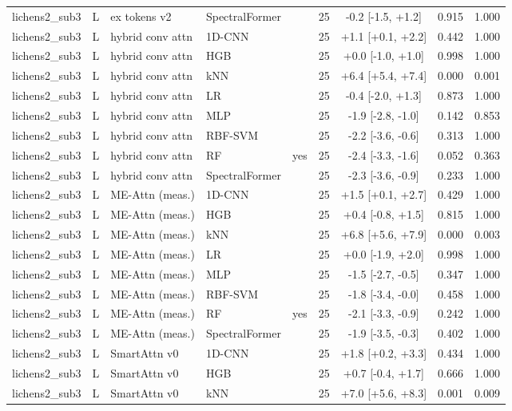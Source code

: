 \begin{tabular}{lllllcccc}
lichens2_sub3 & L & ex tokens v2 & SpectralFormer &  & 25 & -0.2 [-1.5, +1.2] & 0.915 & 1.000 \\
lichens2_sub3 & L & hybrid conv attn & 1D-CNN &  & 25 & +1.1 [+0.1, +2.2] & 0.442 & 1.000 \\
lichens2_sub3 & L & hybrid conv attn & HGB &  & 25 & +0.0 [-1.0, +1.0] & 0.998 & 1.000 \\
lichens2_sub3 & L & hybrid conv attn & kNN &  & 25 & +6.4 [+5.4, +7.4] & 0.000 & 0.001 \\
lichens2_sub3 & L & hybrid conv attn & LR &  & 25 & -0.4 [-2.0, +1.3] & 0.873 & 1.000 \\
lichens2_sub3 & L & hybrid conv attn & MLP &  & 25 & -1.9 [-2.8, -1.0] & 0.142 & 0.853 \\
lichens2_sub3 & L & hybrid conv attn & RBF-SVM &  & 25 & -2.2 [-3.6, -0.6] & 0.313 & 1.000 \\
lichens2_sub3 & L & hybrid conv attn & RF & yes & 25 & -2.4 [-3.3, -1.6] & 0.052 & 0.363 \\
lichens2_sub3 & L & hybrid conv attn & SpectralFormer &  & 25 & -2.3 [-3.6, -0.9] & 0.233 & 1.000 \\
lichens2_sub3 & L & ME-Attn (meas.) & 1D-CNN &  & 25 & +1.5 [+0.1, +2.7] & 0.429 & 1.000 \\
lichens2_sub3 & L & ME-Attn (meas.) & HGB &  & 25 & +0.4 [-0.8, +1.5] & 0.815 & 1.000 \\
lichens2_sub3 & L & ME-Attn (meas.) & kNN &  & 25 & +6.8 [+5.6, +7.9] & 0.000 & 0.003 \\
lichens2_sub3 & L & ME-Attn (meas.) & LR &  & 25 & +0.0 [-1.9, +2.0] & 0.998 & 1.000 \\
lichens2_sub3 & L & ME-Attn (meas.) & MLP &  & 25 & -1.5 [-2.7, -0.5] & 0.347 & 1.000 \\
lichens2_sub3 & L & ME-Attn (meas.) & RBF-SVM &  & 25 & -1.8 [-3.4, -0.0] & 0.458 & 1.000 \\
lichens2_sub3 & L & ME-Attn (meas.) & RF & yes & 25 & -2.1 [-3.3, -0.9] & 0.242 & 1.000 \\
lichens2_sub3 & L & ME-Attn (meas.) & SpectralFormer &  & 25 & -1.9 [-3.5, -0.3] & 0.402 & 1.000 \\
lichens2_sub3 & L & SmartAttn v0 & 1D-CNN &  & 25 & +1.8 [+0.2, +3.3] & 0.434 & 1.000 \\
lichens2_sub3 & L & SmartAttn v0 & HGB &  & 25 & +0.7 [-0.4, +1.7] & 0.666 & 1.000 \\
lichens2_sub3 & L & SmartAttn v0 & kNN &  & 25 & +7.0 [+5.6, +8.3] & 0.001 & 0.009 \\

\end{tabular}
